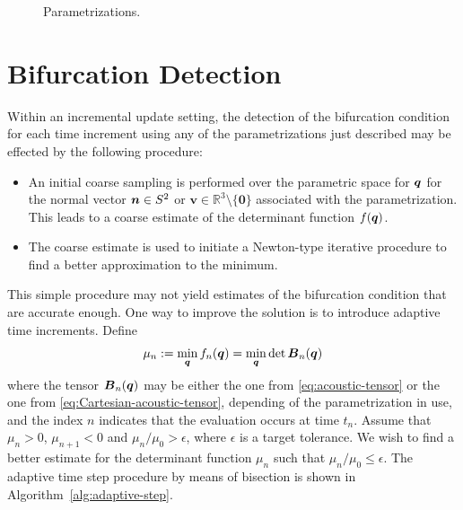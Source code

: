 \documentclass[12pt]{article}
\newcommand{\mbs}[1]{\boldsymbol{#1}}
\newcommand{\mbb}[1]{\mathbb{#1}}
\def\bv{{\mbs{v}}} \def\bw{{\mbs{w}}} \def\bx{{\mbs{x}}}
\numberwithin{equation}{section}
\begin{document}
\begin{figure}[htbp]
\begin{center}
{      \label{fig:tangent}
    }
    \caption{Parametrizations.}
    \label{fig:parametrizations}
  \end{center}
\end{figure}

\section{Bifurcation Detection}

Within an incremental update setting, the detection of the bifurcation
condition for each time increment using any of the parametrizations
just described may be effected by the following procedure:

\begin{itemize}
  
\item An initial coarse sampling is performed over the parametric
  space for $\bq$ for the normal vector $\bn \in S^2$ or $\bv \in
  \mbb{R}^3 \setminus \{\mathbf{0}\}$ associated with the
  parametrization. This leads to a coarse estimate of the determinant
  function $f(\bq)$.
  
\item The coarse estimate is used to initiate a Newton-type iterative
  procedure to find a better approximation to the minimum.


\end{itemize}

This simple procedure may not yield estimates of the bifurcation
condition that are accurate enough. One way to improve the solution is
to introduce adaptive time increments. Define
\begin{equation} \label{eq:general-minimization-problem}
  \mu_n := \min_{\bq} f_n(\bq) = \min_{\bq} \det \bB_n(\bq)
\end{equation}
where the tensor $\bB_n(\bq)$ may be either the one from
\eqref{eq:acoustic-tensor} or the one from
\eqref{eq:Cartesian-acoustic-tensor}, depending of the parametrization
in use, and the index $n$ indicates that the evaluation occurs at time
$t_n$. Assume that $\mu_n > 0$, $\mu_{n+1} < 0$ and $\mu_n / \mu_0 >
\epsilon$, where $\epsilon$ is a target tolerance. We wish to find a
better estimate for the determinant function $\mu_n$ such that $\mu_n
/ \mu_0 \le \epsilon$. The adaptive time step procedure by means of
bisection is shown in Algorithm~\ref{alg:adaptive-step}.
\end{document}
